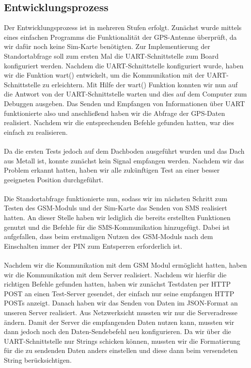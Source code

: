 \subsection{Entwicklungsprozess}
Der Entwicklungsprozess ist in mehreren Stufen erfolgt. Zunächst wurde mittels eines einfachen Programms die Funktionalität der GPS-Antenne überprüft, da wir dafür noch keine Sim-Karte benötigten. Zur Implementierung der Standortabfrage soll zum ersten Mal die UART-Schnittstelle zum Board konfiguriert werden. Nachdem die UART-Schnittstelle konfiguriert wurde, haben wir die Funktion wart() entwickelt, um die Kommunikation mit der UART-Schnittstelle zu erleichtern. Mit Hilfe der wart() Funktion konnten wir nun auf die Antwort von der UART-Schnittstelle warten und dies auf dem Computer zum Debuggen ausgeben. Das Senden und Empfangen von Informationen über UART funktionierte also und anschließend haben wir die Abfrage der GPS-Daten realisiert. Nachdem wir die entsprechenden Befehle gefunden hatten, war dies einfach zu realisieren.
\\
\\
Da die ersten Tests jedoch auf dem Dachboden ausgeführt wurden und das Dach aus Metall ist, konnte zunächst kein Signal empfangen werden. Nachdem wir das Problem erkannt hatten, haben wir alle zukünftigen Test an einer besser geeigneten Position durchgeführt.
\\
\\
Die Standortabfrage funktionierte nun, sodass wir im nächsten Schritt zum Testen des GSM-Moduls und der Sim-Karte das Senden von SMS realisiert hatten. An dieser Stelle haben wir lediglich die bereits erstellten Funktionen genutzt und die Befehle für die SMS-Kommunikation hinzugefügt. Dabei ist aufgefallen, dass beim erstmaligen Nutzen des GSM-Moduls nach dem Einschalten immer der PIN zum Entsperren erforderlich ist. 
\\
\\
Nachdem wir die Kommunikation mit dem GSM Modul ermöglicht hatten, haben wir die Kommunikation mit dem Server realisiert.
Nachdem wir hierfür die richtigen Befehle gefunden hatten, haben wir zunächst Testdaten per HTTP POST an einen Test-Server gesendet, der einfach nur seine empfangen HTTP POSTs anzeigt. Danach haben wir das Senden von Daten im JSON-Format an unseren Server realisiert. Aus Netzwerksicht mussten wir nur die Serveradresse ändern.  Damit der Server die empfangenden Daten nutzen kann, mussten wir dann jedoch noch den Daten-Sendebefehl neu konfigurieren. Da wir über die UART-Schnittstelle nur Strings schicken können, mussten wir die Formatierung für die zu sendenden Daten anders einstellen und diese  dann beim versendeten String berücksichtigen. 
